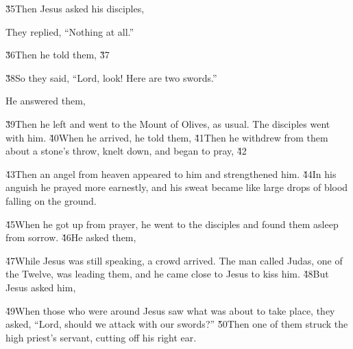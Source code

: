 \v{35}Then Jesus asked his disciples, 

They replied, ``Nothing at all.''

\v{36}Then he told them,  \v{37}

\v{38}So they said, ``Lord, look! Here are two swords.''

He answered them, 

\v{39}Then he left and went to the Mount of Olives, as usual. The disciples went with him. \v{40}When he arrived, he told them,  \v{41}Then he withdrew from them about a stone's throw, knelt down, and began to pray, \v{42}

\v{43}Then an angel from heaven appeared to him and strengthened him. \v{44}In his anguish he prayed more earnestly, and his sweat became like large drops of blood falling on the ground.

\v{45}When he got up from prayer, he went to the disciples and found them asleep from sorrow. \v{46}He asked them, 

\v{47}While Jesus was still speaking, a crowd arrived. The man called Judas, one of the Twelve, was leading them, and he came close to Jesus to kiss him. \v{48}But Jesus asked him, 

\v{49}When those who were around Jesus saw what was about to take place, they asked, ``Lord, should we attack with our swords?'' \v{50}Then one of them struck the high priest's servant, cutting off his right ear.

